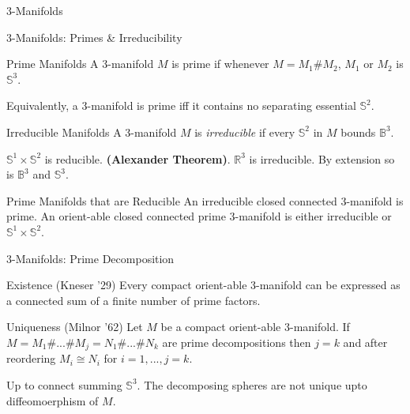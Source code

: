 \documentclass{beamer}
\begin{document}
\begin{section}{3-Manifolds}
\begin{frame}{3-Manifolds: Primes \& Irreducibility}
    \begin{block}{Prime Manifolds}
        A 3-manifold $M$ is prime if whenever $M=M_1\#M_2$, $M_1$ or $M_2$ is $\mathbb{S}^3$.
    \end{block}{}
    Equivalently, a 3-manifold is prime iff it contains no separating essential $\mathbb{S}^2$.
    \begin{block}{Irreducible Manifolds}
        A 3-manifold $M$ is \textit{irreducible} if every $\mathbb{S}^2$ in $M$ bounds $\mathbb{B}^3$.
    \end{block}{}    
    $\mathbb{S}^1\times \mathbb{S}^2$ is reducible.
    \newline
    \textbf{(Alexander Theorem)}. $\mathbb{R}^3$ is irreducible. By extension so is $\mathbb{B}^3$ and $\mathbb{S}^3$.
    \begin{block}{Prime Manifolds that are Reducible }
        An irreducible closed connected 3-manifold is prime. An orient-able closed connected prime 3-manifold is either irreducible or $\mathbb{S}^1\times \mathbb{S}^2$.
    \end{block}{}
    
\end{frame}{}

\begin{frame}{3-Manifolds: Prime Decomposition}
    \begin{block}{Existence (Kneser '29)}
        Every compact orient-able 3-manifold can be expressed as a connected sum of a finite number of prime factors.
    \end{block}{}
    \begin{block}{Uniqueness (Milnor '62)}
        Let $M$ be a compact orient-able 3-manifold. If $M=M_1\#...\#M_j=N_1\#...\#N_k$ are prime decompositions then $j=k$ and after reordering $M_i \cong N_i$ for $i=1,...,j=k$.
    \end{block}{}
    
    Up to connect summing $\mathbb{S}^3$.
    \newline
    \newline
    The decomposing spheres are not unique upto diffeomoerphism of $M$.
 

\end{frame}
\end{section}
\end{document}
